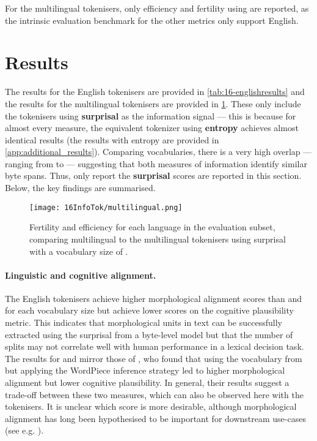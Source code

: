 For the multilingual tokenisers, only \renyi efficiency and fertility using \commoncorpus are reported, as the intrinsic evaluation benchmark for the other metrics only support English.

\section{Results}\label{sec:16-results}

The results for the English tokenisers are provided in \cref{tab:16-englishresults} and the results for the multilingual tokenisers are provided in \cref{fig:16-multilingual}. These only include the \tokname tokenisers using \textbf{surprisal} as the information signal --- this is because for almost every measure, the equivalent tokenizer using \textbf{entropy} achieves almost identical results (the results with entropy are provided in \cref{app:additional_results}). Comparing vocabularies, there is a very high overlap --- ranging from  to  --- suggesting that both measures of information identify similar byte spans. Thus, only report the \textbf{surprisal} scores are reported in this section. Below, the key findings are summarised.

\begin{figure}[!t]
    \centering
    \texttt{[image: 16InfoTok/multilingual.png]}
    \caption{Fertility and \renyi efficiency for each language in the \commoncorpus evaluation subset, comparing multilingual \bpe to the multilingual \tokname tokenisers using surprisal with a vocabulary size of .}
    \label{fig:16-multilingual}
\end{figure}

\paragraph{Linguistic and cognitive alignment.}

The English \tokname tokenisers achieve higher morphological alignment scores than \bpe and \bpewp for each vocabulary size but achieve lower scores on the cognitive plausibility metric. This indicates that morphological units in text can be successfully extracted using the surprisal from a byte-level model but that the number of splits may not correlate well with human performance in a lexical decision task. The results for \bpe and \bpewp mirror those of \citet{uzan-etal-2024-greed}, who found that using the vocabulary from \bpe but applying the WordPiece inference strategy led to higher morphological alignment but lower cognitive plausibility. In general, their results suggest a trade-off between these two measures, which can also be observed here with the \tokname tokenisers. It is unclear which score is more desirable, although morphological alignment has long been hypothesised to be important for downstream use-cases (see e.g. \citet{gow-smith-etal-2022-improving}).

